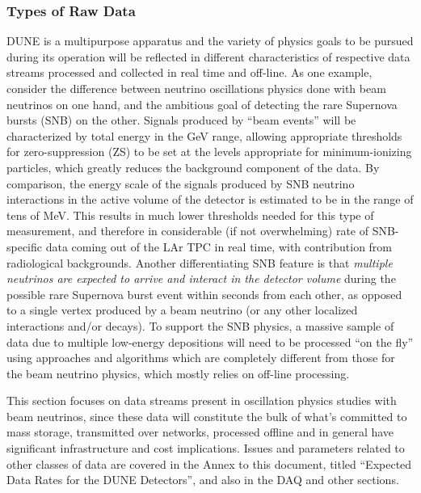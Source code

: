 \subsubsection{Types of Raw Data}
DUNE is a multipurpose apparatus and the variety of physics goals to be pursued during its operation
will be reflected in different characteristics of respective data streams processed and collected in real time and off-line.
As one example, consider the difference between neutrino oscillations physics done with beam neutrinos
on one hand, and the ambitious goal of detecting the rare Supernova bursts (SNB) on the other.
Signals produced by ``beam events'' will be characterized by total energy in the GeV range, allowing
appropriate thresholds for zero-suppression (ZS) to be set at the levels appropriate for
minimum-ionizing particles, which greatly reduces the
background component of the data. By comparison, the energy scale of the signals produced by
SNB neutrino interactions in the active volume of the detector is estimated to be in the range of tens
of MeV. This results in much lower thresholds needed for this type of measurement, and therefore
in considerable (if not overwhelming) rate of SNB-specific data coming
out of the LAr TPC in real time, with contribution from radiological backgrounds.
Another differentiating SNB feature is that \textit{multiple neutrinos are expected
to arrive and interact in the detector volume} during the possible rare Supernova burst event within seconds
from each other, as opposed to a single vertex produced by a beam neutrino (or any other localized
interactions and/or decays).
To support the SNB physics, a massive sample of data due to multiple low-energy
depositions will need to be processed ``on the fly''
using approaches and algorithms which are completely  different from those for the
beam neutrino physics, which mostly relies on off-line processing.

This section focuses on data streams present in
oscillation physics studies with beam neutrinos, since these data will constitute the bulk of what's committed
to mass storage, transmitted over networks, processed offline and in general have significant
infrastructure and cost implications. Issues and parameters related to other classes of data
are covered in the Annex to this document, titled ``Expected Data Rates for the DUNE Detectors'',
and also in the DAQ and other sections.

